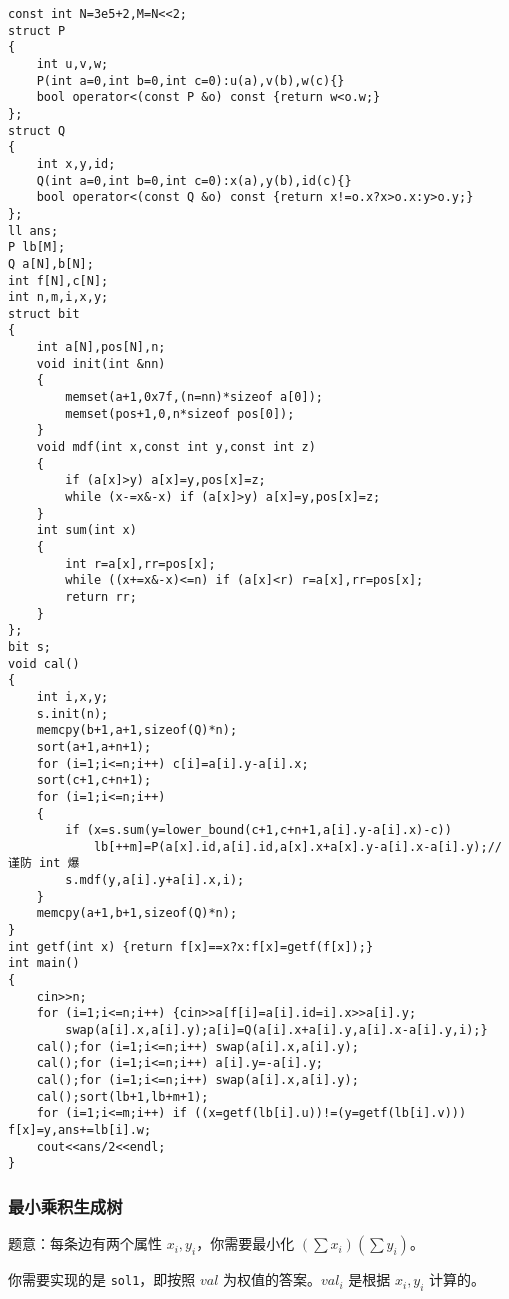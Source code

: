 \documentclass[12pt]{ctexart}
\begin{document}
\begin{lstlisting}
const int N=3e5+2,M=N<<2;
struct P
{
	int u,v,w;
	P(int a=0,int b=0,int c=0):u(a),v(b),w(c){}
	bool operator<(const P &o) const {return w<o.w;}
};
struct Q
{
	int x,y,id;
	Q(int a=0,int b=0,int c=0):x(a),y(b),id(c){}
	bool operator<(const Q &o) const {return x!=o.x?x>o.x:y>o.y;}
};
ll ans;
P lb[M];
Q a[N],b[N];
int f[N],c[N];
int n,m,i,x,y;
struct bit
{
	int a[N],pos[N],n;
	void init(int &nn)
	{
		memset(a+1,0x7f,(n=nn)*sizeof a[0]);
		memset(pos+1,0,n*sizeof pos[0]);
	}
	void mdf(int x,const int y,const int z)
	{
		if (a[x]>y) a[x]=y,pos[x]=z;
		while (x-=x&-x) if (a[x]>y) a[x]=y,pos[x]=z;
	}
	int sum(int x)
	{
		int r=a[x],rr=pos[x];
		while ((x+=x&-x)<=n) if (a[x]<r) r=a[x],rr=pos[x];
		return rr;
	}
};
bit s;
void cal()
{
	int i,x,y;
	s.init(n);
	memcpy(b+1,a+1,sizeof(Q)*n);
	sort(a+1,a+n+1);
	for (i=1;i<=n;i++) c[i]=a[i].y-a[i].x;
	sort(c+1,c+n+1);
	for (i=1;i<=n;i++)
	{
		if (x=s.sum(y=lower_bound(c+1,c+n+1,a[i].y-a[i].x)-c))
			lb[++m]=P(a[x].id,a[i].id,a[x].x+a[x].y-a[i].x-a[i].y);//谨防 int 爆
		s.mdf(y,a[i].y+a[i].x,i);
	}
	memcpy(a+1,b+1,sizeof(Q)*n);
}
int getf(int x) {return f[x]==x?x:f[x]=getf(f[x]);}
int main()
{
	cin>>n;
	for (i=1;i<=n;i++) {cin>>a[f[i]=a[i].id=i].x>>a[i].y;
		swap(a[i].x,a[i].y);a[i]=Q(a[i].x+a[i].y,a[i].x-a[i].y,i);}
	cal();for (i=1;i<=n;i++) swap(a[i].x,a[i].y);
	cal();for (i=1;i<=n;i++) a[i].y=-a[i].y;
	cal();for (i=1;i<=n;i++) swap(a[i].x,a[i].y);
	cal();sort(lb+1,lb+m+1);
	for (i=1;i<=m;i++) if ((x=getf(lb[i].u))!=(y=getf(lb[i].v))) f[x]=y,ans+=lb[i].w;
	cout<<ans/2<<endl;
}
\end{lstlisting}

\subsubsection{最小乘积生成树}

题意：每条边有两个属性 $x_i,y_i$，你需要最小化 $(\sum x_i)(\sum y_i)$。

你需要实现的是 \verb|sol1|，即按照 $val$ 为权值的答案。$val_i$ 是根据 $x_i,y_i$ 计算的。
\end{document}

